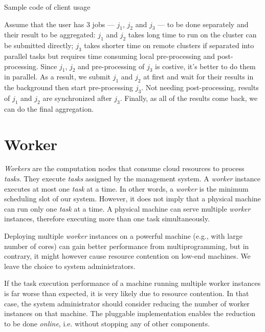 \begin{Example Code}
  
  \caption{Sample code of client usage}
\end{Example Code}

Assume that the user has 3 jobs --- $j_1$, $j_2$ and $j_3$ --- to be
done separately and their result to be aggregated:  $j_1$ and $j_2$
takes long time to run on the cluster can be submitted directly; $j_3$
takes shorter time on remote clusters if separated into parallel tasks
but requires time consuming local pre-processing and post-processing.
Since $j_1$, $j_2$ and pre-processing of $j_3$ is costive, it's better
to do them in parallel.
As a result, we submit $j_1$ and $j_2$ at first and wait for their
results in the background then start pre-processing $j_3$.
Not needing post-processing, results of $j_1$ and $j_2$ are synchronized
after $j_3$.
Finally, as all of the results come back, we can do the final
aggregation.

\section{Worker}	%

\emph{Workers} are the computation nodes that consume cloud resources to
process \emph{tasks}.
They execute \emph{tasks} assigned by the management system.
A \emph{worker} instance executes at most one \emph{task} at a time.
In other words, a \emph{worker} is the minimum scheduling slot of our
system.
However, it does not imply that a physical machine can run only one
\emph{task} at a time.
A physical machine can serve multiple \emph{worker} instances, therefore
executing more than one task simultaneously.

Deploying multiple \emph{worker} instances on a powerful machine (e.g.,
with large number of cores) can gain better performance from
multiprogramming, but in contrary, it might however cause resource
contention on low-end machines.
We leave the choice to system administrators.

If the task execution performance of a machine running multiple worker
instances is far worse than expected, it is very likely due to resource
contention.
In that case, the system administrator should consider reducing the
number of worker instances on that machine.
The pluggable implementation enables the reduction to be done \emph{
online}, i.e. without stopping any of other components.


